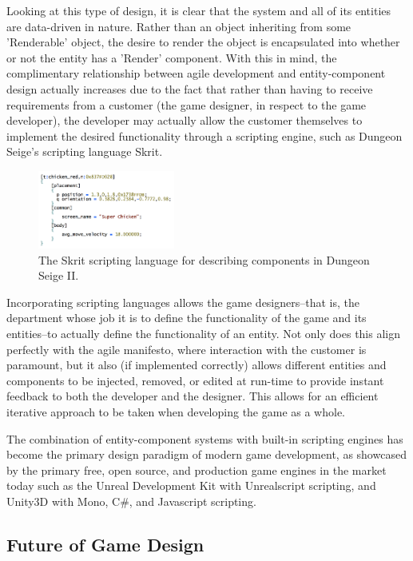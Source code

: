 Looking at this type of design, it is clear that the system and all of its entities are data-driven in nature. Rather than an object inheriting from some 'Renderable' object, the desire to render the object is encapsulated into whether or not the entity has a 'Render' component. With this in mind, the complimentary relationship between agile development and entity-component design actually increases due to the fact that rather than having to receive requirements from a customer (the game designer, in respect to the game developer), the developer may actually allow the customer themselves to implement the desired functionality through a scripting engine, such as Dungeon Seige's scripting language Skrit.

\begin{figure}[h!]
  \centering \includegraphics[width=0.4\textwidth]{Images/skrit.png}
	\caption{The Skrit scripting language for describing components in Dungeon Seige II\cite{bilas2002data}.}
\end{figure}

Incorporating scripting languages allows the game designers--that is, the department whose job it is to define the functionality of the game and its entities--to actually define the functionality of an entity. Not only does this align perfectly with the agile manifesto, where interaction with the customer is paramount, but it also (if implemented correctly) allows different entities and components to be injected, removed, or edited at run-time to provide instant feedback to both the developer and the designer. This allows for an efficient iterative approach to be taken when developing the game as a whole.

The combination of entity-component systems with built-in scripting engines has become the primary design paradigm of modern game development, as showcased by the primary free, open source, and production game engines in the market today such as the Unreal Development Kit with Unrealscript scripting, and Unity3D with Mono, C\#, and Javascript scripting.

\subsection{Future of Game Design}

